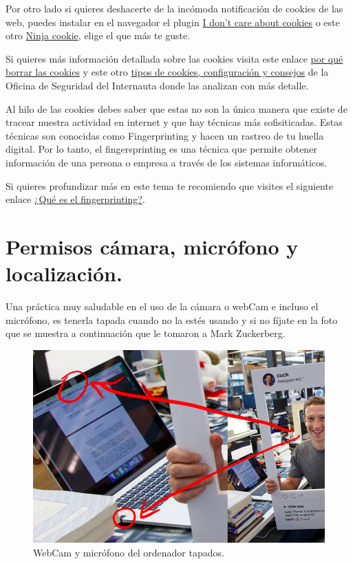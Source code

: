 \documentclass[
  spanish,
  a4paper,
  openany]{book}
\begin{document}
Por otro lado si quieres deshacerte de la incómoda notificación de cookies de las web, puedes instalar en el navegador el plugin \href{https://www.i-dont-care-about-cookies.eu/}{I don't care about cookies} o este otro \href{https://ninja-cookie.com/}{Ninja cookie}, elige el que más te guste.

Si quieres más información detallada sobre las cookies visita este enlace \href{https://www.osi.es/es/actualidad/blog/2019/09/11/por-que-borrar-las-cookies-del-navegador}{por qué borrar las cookies} y este otro \href{https://www.osi.es/es/actualidad/blog/2018/07/18/entre-cookies-y-privacidad}{tipos de cookies, configuración y consejos} de la Oficina de Seguridad del Internauta donde las analizan con más detalle.

Al hilo de las cookies debes saber que estas no son la única manera que existe de tracear nuestra actividad en internet y que hay técnicas más sofisiticadas. Estas técnicas son conocidas como Fingerprinting y hacen un rastreo de tu huella digital. Por lo tanto, el fingersprinting es una técnica que permite obtener información de una persona o empresa a través de los sistemas informáticos.

Si quieres profundizar más en este tema te recomiendo que visites el siguiente enlace \href{https://protecciondatos-lopd.com/empresas/fingerprinting-que-es/}{¿Qué es el fingerprinting?}.

\hypertarget{permisos-cuxe1mara-micruxf3fono-y-localizaciuxf3n.}{%
\section{Permisos cámara, micrófono y localización.}\label{permisos-cuxe1mara-micruxf3fono-y-localizaciuxf3n.}}

Una práctica muy saludable en el uso de la cámara o webCam e incluso el micrófono, es tenerla tapada cuando no la estés usando y si no fíjate en la foto que se muestra a continuación que le tomaron a Mark Zuckerberg.

\begin{figure}

{\centering \includegraphics[width=0.75\linewidth]{images/webca-mark-zuckerberg} 

}

\caption{WebCam y micrófono del ordenador tapados.}\label{fig:unnamed-chunk-6}
\end{figure}
\end{document}

